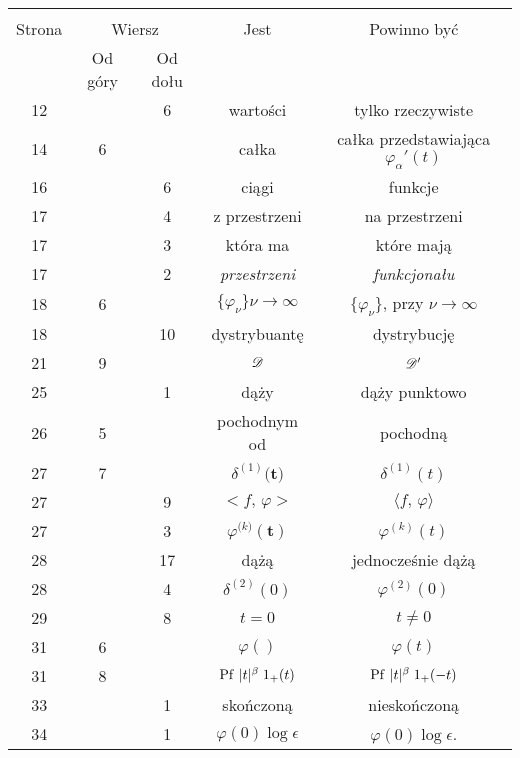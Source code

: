 \documentclass[a4paper,11pt]{article}
\begin{document}
\begin{center}

  \begin{tabular}{|c|c|c|c|c|}
    \hline
    & \multicolumn{2}{c|}{} & & \\
    Strona & \multicolumn{2}{c|}{Wiersz} & Jest
                              & Powinno być \\ \cline{2-3}
    & Od góry & Od dołu & & \\
    \hline
    12  & &  6 & wartości & tylko rzeczywiste \\
    14  &  6 & & całka & całka przedstawiająca $\varphi_{ \alpha }'( t )$ \\
    16  & &  6 & ciągi & funkcje \\
    17  & &  4 & z przestrzeni & na przestrzeni \\
    17  & &  3 & która ma & które mają \\
    17  & &  2 & \emph{przestrzeni} & \emph{funkcjonału} \\
    18  &  6 & & $\{ \varphi_{ \nu } \}\nu \to \infty$
           & $\{ \varphi_{ \nu } \}$, przy $\nu \to \infty$ \\
    18  & & 10 & dystrybuantę & dystrybucję \\
    21  &  9 & & $\mathcal{D}$ & $\mathcal{D}'$ \\
    25  & &  1 & dąży & dąży punktowo \\
    26  &  5 & & pochodnym od & pochodną \\
    27  &  7 & & $\delta^{ ( 1 ) }\boldsymbol{ ( t } )$ & $\delta^{ ( 1 ) }( t )$ \\
    27  & &  9 & $< f,\, \varphi >$ & $\langle f, \, \varphi \rangle$ \\
    27  & &  3 & $\varphi^{ ( k \boldsymbol{ ) } }\boldsymbol{ ( t ) } $
           & $\varphi^{ ( k ) }( t )$ \\
    28  & & 17 & dążą & jednocześnie dążą \\
    28  & &  4 & $\delta^{ ( 2 ) }( 0 )$ & $\varphi^{ ( 2 ) }( 0 )$ \\
    29  & &  8 & $t = 0$ & $t \neq 0$ \\
    31  &  6 & & $\varphi( )$ & $\varphi( t )$ \\
    31  &  8 & & $\mathrm{Pf}\, \, | t |^{ \beta } \; 1_{ + }( t )$
           & $\mathrm{Pf}\, \, | t |^{ \beta } \; 1_{ + }( -t )$ \\
    33  & &  1 & skończoną & nieskończoną \\
    34  & &  1 & $\varphi( 0 ) \log \epsilon$ & $\varphi( 0 ) \log \epsilon$. \\

\end{tabular}
\end{center}
\end{document}
